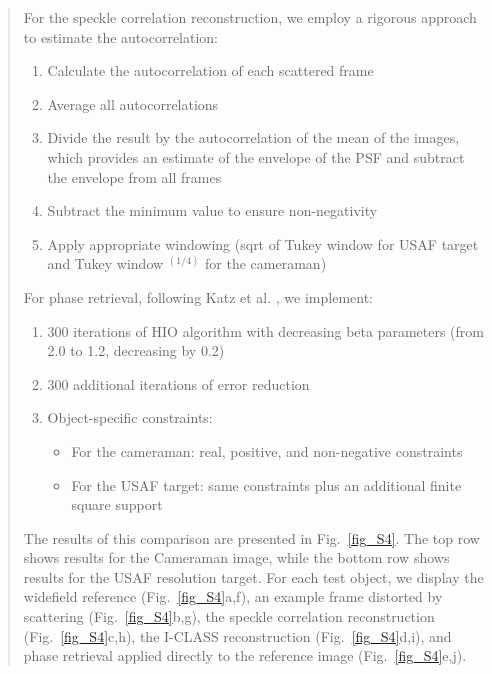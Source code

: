 \documentclass[12pt]{article}
\newenvironment{ourresponse}
    {\begin{tcolorbox}[width=\linewidth,breakable,enhanced,colback=gray!5,colframe=responsecolor!50,title=Response,left=5pt,right=5pt]}
    {\end{tcolorbox}}
\begin{document}
\begin{ourresponse}
\begin{quote}
                For the speckle correlation reconstruction, we employ a rigorous approach to estimate the autocorrelation:
                \begin{enumerate}
                    \item Calculate the autocorrelation of each scattered frame
                    \item Average all autocorrelations
                    \item Divide the result by the autocorrelation of the mean of the images, which provides an estimate of the envelope of the PSF and subtract the envelope from all frames
                    \item Subtract the minimum value to ensure non-negativity
                    \item Apply appropriate windowing (sqrt of Tukey window for USAF target and Tukey window $^{(1/4)}$ for the cameraman)
                \end{enumerate}
                
                For phase retrieval, following Katz et al. \cite{katz14}, we implement:
                \begin{enumerate}
                    \item 300 iterations of HIO algorithm with decreasing beta parameters (from 2.0 to 1.2, decreasing by 0.2)
                    \item 300 additional iterations of error reduction
                    \item Object-specific constraints:
                    \begin{itemize}
                        \item For the cameraman: real, positive, and non-negative constraints
                        \item For the USAF target: same constraints plus an additional finite square support
                    \end{itemize}
                \end{enumerate}
                
                The results of this comparison are presented in Fig.~\ref{fig_S4}. The top row shows results for the Cameraman image, while the bottom row shows results for the USAF resolution target. For each test object, we display the widefield reference (Fig.~\ref{fig_S4}a,f), an example frame distorted by scattering (Fig.~\ref{fig_S4}b,g), the speckle correlation reconstruction (Fig.~\ref{fig_S4}c,h), the I-CLASS reconstruction (Fig.~\ref{fig_S4}d,i), and phase retrieval applied directly to the reference image (Fig.~\ref{fig_S4}e,j).
                

\end{quote}
\end{ourresponse}
\end{document}
